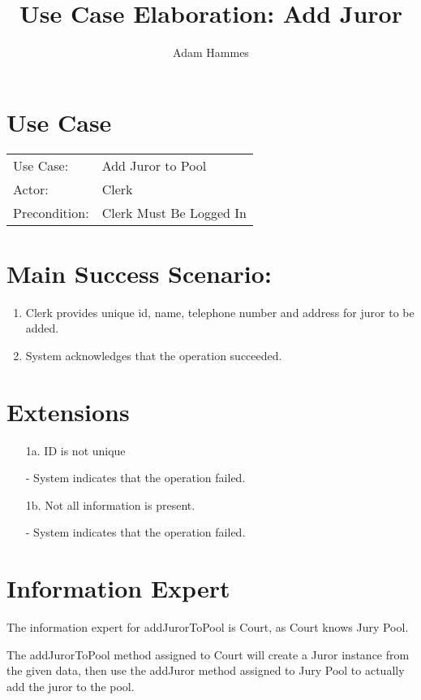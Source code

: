\documentclass{article}
\title{Use Case Elaboration: Add Juror}
\author{Adam Hammes}
\begin{document}
\maketitle

\section*{Use Case}
\begin{tabular}{l l}
  Use Case:     & Add Juror to Pool\\
  Actor:        & Clerk\\
  Precondition: & Clerk Must Be Logged In\\
\end{tabular}

\section*{Main Success Scenario:}
\begin{enumerate}
  \item Clerk provides unique id, name, telephone number and address for juror to be added.
  \item System acknowledges that the operation succeeded.
\end{enumerate}

\section*{Extensions}
\begin{itemize}
  \item [1a.] ID is not unique
  
  - System indicates that the operation failed.
  
  \item [1b.] Not all information is present.
  
  - System indicates that the operation failed.
    
\end{itemize}

\section*{Information Expert}

The information expert for addJurorToPool is Court, as Court knows Jury Pool.

The addJurorToPool method assigned to Court will create a Juror instance from the given data, then use the addJuror method assigned to Jury Pool to actually add the juror to the pool.
\end{document}
